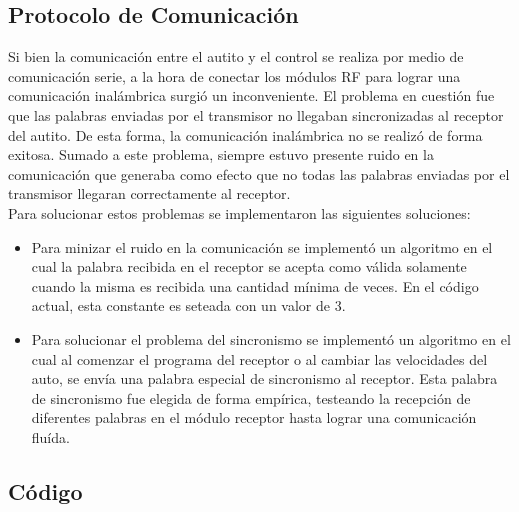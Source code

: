 \documentclass[a4paper,10pt]{article}
\begin{document}
		\subsection{Protocolo de Comunicación}
			Si bien la comunicación entre el autito y el control se realiza por medio de comunicación serie, a la hora de conectar
			los módulos RF para lograr una comunicación inalámbrica surgió un inconveniente. El problema en cuestión fue que las palabras enviadas por el 
			transmisor no llegaban sincronizadas al receptor del autito. De esta forma, la comunicación inalámbrica no se realizó de forma exitosa. Sumado a este 
			problema, siempre estuvo presente ruido en la comunicación que generaba como efecto que no todas las palabras enviadas por el transmisor llegaran 
			correctamente al receptor.\\
			\indent Para solucionar estos problemas se implementaron las siguientes soluciones:
			\begin{itemize}
				\item Para minizar el ruido en la comunicación se implementó un algoritmo en el cual la palabra recibida en el receptor se acepta como válida
				solamente cuando la misma es recibida una cantidad mínima de veces. En el código actual, esta constante es seteada con un valor de 3.
				\item Para solucionar el problema del sincronismo se implementó un algoritmo en el cual al comenzar el programa del receptor o al cambiar las
				velocidades del auto, se envía una palabra especial de sincronismo al receptor. Esta palabra de sincronismo fue elegida de forma empírica, testeando 
				la recepción de diferentes palabras en el módulo receptor hasta lograr una comunicación fluída.  
			\end{itemize}

		\subsection{Código}
\end{document}
